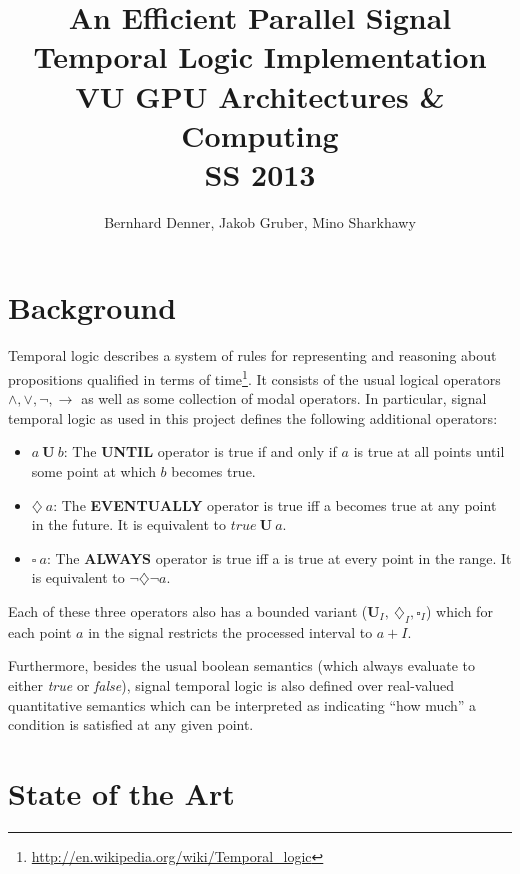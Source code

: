\documentclass[a4paper,10pt]{article}
\title{
	An Efficient Parallel Signal Temporal Logic Implementation \\
    VU GPU Architectures \& Computing \\
    SS 2013
}
\author{
    Bernhard Denner,
    Jakob Gruber,
    Mino Sharkhawy
}
\renewcommand{\And}{\wedge}
\newcommand{\Or}{\vee}
\newcommand{\Neg}{\neg}
\newcommand{\Impl}{\rightarrow}
\newcommand{\Until}{\mathbf{U}}
\newcommand{\Evtl}{\diamondsuit}
\newcommand{\Alw}{\square}
\newcommand{\Buntil}{\mathbf{U}_I}
\newcommand{\Bevtl}{\diamondsuit_I}
\newcommand{\Balw}{\square_I}
\begin{document}

\maketitle
\pagebreak
\tableofcontents
\pagebreak

\section{Background}

Temporal logic describes a system of rules for representing and reasoning about propositions
qualified in terms of time\footnote{\url{http://en.wikipedia.org/wiki/Temporal_logic}}.
It consists of the usual logical operators $\And, \Or, \Neg, \Impl$ as well as
some collection of modal operators. In particular, signal temporal logic as used in this
project defines the following additional operators:

\begin{itemize}
\item $a \: \Until \: b$: The \textbf{UNTIL} operator is true if and only if $a$ is true
      at all points until some point at which $b$ becomes true.
\item $\Evtl \: a$: The \textbf{EVENTUALLY} operator is true iff a becomes true at any point
      in the future. It is equivalent to $\mathit{true} \: \Until \: a$.
\item $\Alw \: a$: The \textbf{ALWAYS} operator is true iff a is true at every point in the range.
      It is equivalent to $\neg \Evtl \neg a$.
\end{itemize}

Each of these three operators also has a bounded variant ($\Buntil, \: \Bevtl, \Balw$) which
for each point $a$ in the signal restricts the processed interval to $a + I$.

Furthermore, besides the usual boolean semantics (which always evaluate to either \textit{true} or
\textit{false}), signal temporal logic is also defined over real-valued quantitative semantics which
can be interpreted as indicating ``how much'' a condition is satisfied at any given point.

\section{State of the Art} \label{sec:stateoftheart}
\end{document}
